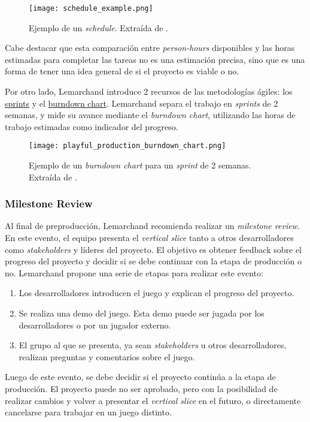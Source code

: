 %
\begin{figure}[H]
    \centering
    \texttt{[image: schedule\_example.png]}
    \caption{Ejemplo de un \textit{schedule}. Extraída de \cite{lemarchandPlayfulProductionProcess2021}.}
    \label{fig:x schedule ejemplo}
\end{figure}
%
\par Cabe destacar que esta comparación entre \textit{person-hours} disponibles y las horas estimadas para completar las tareas no es una estimación precisa, sino que es una forma de tener una idea general de si el proyecto es viable o no.
\bigbreak
\par Por otro lado, Lemarchand introduce 2 recursos de las metodologías ágiles: los \hyperref[sec:sprint]{sprints} y el \hyperref[sec:burndown_chart]{burndown chart}. Lemarchand separa el trabajo en \textit{sprints} de 2 semanas, y mide su avance mediante el \textit{burndown chart}, utilizando las horas de trabajo estimadas como indicador del progreso.
%
\begin{figure}[H]
    \centering
    \texttt{[image: playful\_production\_burndown\_chart.png]}
    \caption{Ejemplo de un \textit{burndown chart} para un \textit{sprint} de 2 semanas. Extraída de \cite{lemarchandPlayfulProductionProcess2021}.}
    \label{fig:x burndown chart Lemarchand}
\end{figure}
%
\subsubsection{Milestone Review}
\par Al final de preproducción, Lemarchand recomienda realizar un \textit{milestone review}. En este evento, el equipo presenta el \textit{vertical slice} tanto a otros desarrolladores como \textit{stakeholders} y líderes del proyecto. El objetivo es obtener feedback sobre el progreso del proyecto y decidir si se debe continuar con la etapa de producción o no. Lemarchand propone una serie de etapas para realizar este evento:
\begin{enumerate}
    \item Los desarrolladores introducen el juego y explican el progreso del proyecto.
    \item Se realiza una demo del juego. Esta demo puede ser jugada por los desarrolladores o por un jugador externo.
    \item El grupo al que se presenta, ya sean \textit{stakeholders} u otros desarrolladores, realizan preguntas y comentarios sobre el juego.
\end{enumerate}
\par Luego de este evento, se debe decidir si el proyecto continúa a la etapa de producción. El proyecto puede no ser aprobado, pero con la posibilidad de realizar cambios y volver a presentar el \textit{vertical slice} en el futuro, o directamente cancelarse para trabajar en un juego distinto.
%
%
%
